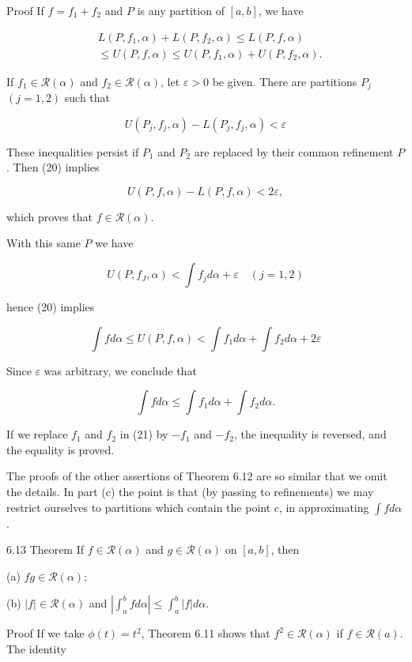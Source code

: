 \documentclass[10pt]{article}
\begin{document}
Proof If $f=f_{1}+f_{2}$ and $P$ is any partition of $[a, b]$, we have

$$
\begin{aligned}
& L\left(P, f_{1}, \alpha\right)+L\left(P, f_{2}, \alpha\right) \leq L(P, f, \alpha) \\
& \leq U(P, f, \alpha) \leq U\left(P, f_{1}, \alpha\right)+U\left(P, f_{2}, \alpha\right) .
\end{aligned}
$$

If $f_{1} \in \mathscr{R}(\alpha)$ and $f_{2} \in \mathscr{R}(\alpha)$, let $\varepsilon>0$ be given. There are partitions $P_{j}$ $(j=1,2)$ such that

$$
U\left(P_{j}, f_{j}, \alpha\right)-L\left(P_{j}, f_{j}, \alpha\right)<\varepsilon
$$

These inequalities persist if $P_{1}$ and $P_{2}$ are replaced by their common refinement $P$. Then (20) implies

$$
U(P, f, \alpha)-L(P, f, \alpha)<2 \varepsilon,
$$

which proves that $f \in \mathscr{R}(\alpha)$.

With this same $P$ we have

$$
U\left(P, f_{J}, \alpha\right)<\int f_{j} d \alpha+\varepsilon \quad(j=1,2)
$$

hence (20) implies

$$
\int f d \alpha \leq U(P, f, \alpha)<\int f_{1} d \alpha+\int f_{2} d \alpha+2 \varepsilon
$$

Since $\varepsilon$ was arbitrary, we conclude that

$$
\int f d \alpha \leq \int f_{1} d \alpha+\int f_{2} d \alpha .
$$

If we replace $f_{1}$ and $f_{2}$ in (21) by $-f_{1}$ and $-f_{2}$, the inequality is reversed, and the equality is proved.

The proofs of the other assertions of Theorem 6.12 are so similar that we omit the details. In part (c) the point is that (by passing to refinements) we may restrict ourselves to partitions which contain the point $c$, in approximating $\int f d \alpha$.

6.13 Theorem If $f \in \mathscr{R}(\alpha)$ and $g \in \mathscr{R}(\alpha)$ on $[a, b]$, then

(a) $f g \in \mathscr{R}(\alpha)$;

(b) $|f| \in \mathscr{R}(\alpha)$ and $\left|\int_{a}^{b} f d \alpha\right| \leq \int_{a}^{b}|f| d \alpha$.

Proof If we take $\phi(t)=t^{2}$, Theorem 6.11 shows that $f^{2} \in \mathscr{R}(\alpha)$ if $f \in \mathscr{R}(a)$. The identity
\end{document}
